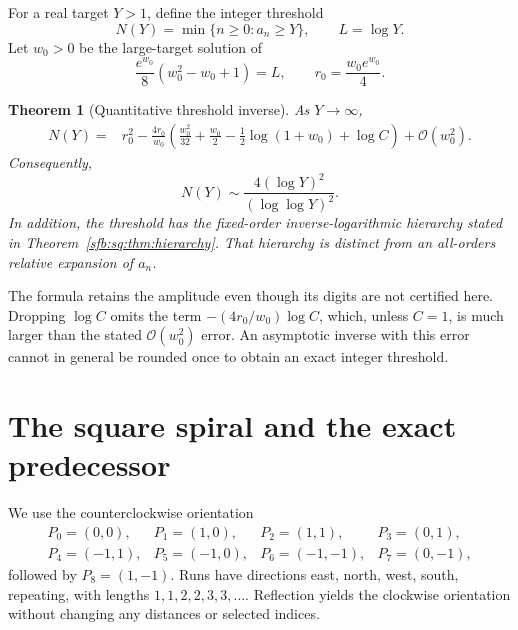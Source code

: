\documentclass[11pt]{article}
\newtheorem{theorem}{Theorem}[section]
\theoremstyle{remark}\newtheorem{remark}[theorem]{Remark}
\newcommand{\OO}{\mathcal O}
\begin{document}
For a real target $Y>1$, define the integer threshold
\begin{equation}\label{sfb:sq:eq:threshold}
 N(Y)=\min\{n\ge0:a_n\ge Y\},\qquad L=\log Y.
\end{equation}
Let $w_0>0$ be the large-target solution of
\begin{equation}\label{sfb:sq:eq:w0}
 \frac{e^{w_0}}8(w_0^2-w_0+1)=L,
 \qquad r_0=\frac{w_0e^{w_0}}4.
\end{equation}

\begin{theorem}[Quantitative threshold inverse]\label{sfb:sq:thm:inverseintro}
As $Y\to\infty$,
\begin{equation}\label{sfb:sq:eq:inverseintro}
 \begin{split}
 N(Y)={}&r_0^2-\frac{4r_0}{w_0}
 \left(\frac{w_0^2}{32}+\frac{w_0}{2}
       -\frac12\log(1+w_0)+\log C\right)
       +\OO(w_0^2).
 \end{split}
\end{equation}
Consequently,
\begin{equation}\label{sfb:sq:eq:inverseleading}
 N(Y)\sim\frac{4(\log Y)^2}{(\log\log Y)^2}.
\end{equation}
In addition, the threshold has the fixed-order inverse-logarithmic hierarchy stated in Theorem~\ref{sfb:sq:thm:hierarchy}. That hierarchy is distinct from an all-orders relative expansion of $a_n$.
\end{theorem}

The formula retains the amplitude even though its digits are not certified here. Dropping $\log C$ omits the term $-(4r_0/w_0)\log C$, which, unless $C=1$, is much larger than the stated $\OO(w_0^2)$ error. An asymptotic inverse with this error cannot in general be rounded once to obtain an exact integer threshold.

\section{The square spiral and the exact predecessor}\label{sfb:sq:sec:geometry}
We use the counterclockwise orientation
\[
\begin{array}{llll}
 P_0=(0,0),&P_1=(1,0),&P_2=(1,1),&P_3=(0,1),\\
 P_4=(-1,1),&P_5=(-1,0),&P_6=(-1,-1),&P_7=(0,-1),
\end{array}
\]
followed by $P_8=(1,-1)$. Runs have directions east, north, west, south, repeating, with lengths $1,1,2,2,3,3,\ldots$. Reflection yields the clockwise orientation without changing any distances or selected indices.
\end{document}
